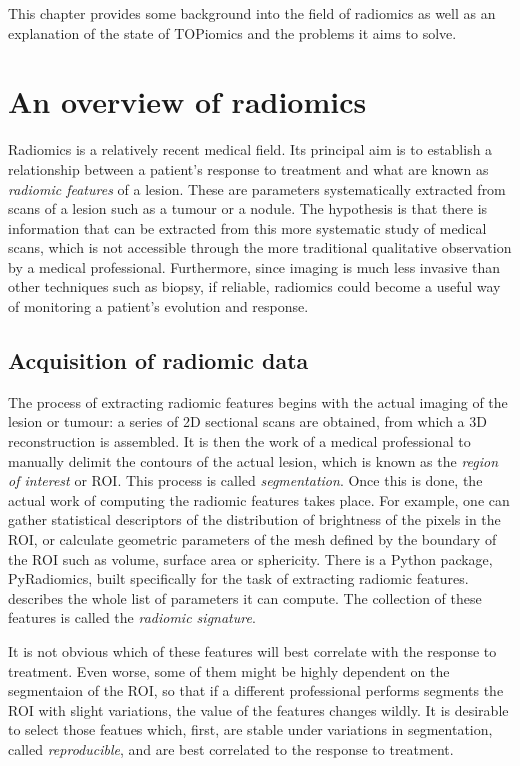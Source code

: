 \documentclass[../main.tex]{subfiles}
\begin{document}
This chapter provides some background into the field of radiomics as well as an
explanation of the state of TOPiomics and the problems it aims to solve. 

\section{An overview of radiomics}
Radiomics is a relatively recent medical field. Its principal aim is to establish a
relationship between a patient's response to treatment and what are known as
\emph{radiomic features} of a lesion. These are parameters systematically extracted from
scans of a lesion such as a tumour or a nodule. The hypothesis is that there is information
that can be extracted from this more systematic study of medical scans, which is not
accessible through the more traditional qualitative observation by a medical professional.
Furthermore, since imaging is much less invasive than other techniques such as biopsy, if
reliable, radiomics could become a useful way of monitoring a patient's evolution and
response. 

\subsection{Acquisition of radiomic data}
The process of extracting radiomic features begins with the actual imaging of the lesion
or tumour: a series of 2D sectional scans are obtained, from which a 3D reconstruction is
assembled. It is then the work of a medical professional to manually delimit the contours
of the actual lesion, which is known as the \emph{region of interest} or ROI. This process is
called \emph{segmentation}. Once this is done, the actual work of computing the radiomic
features takes place. For example, one can gather statistical descriptors of the
distribution of brightness of the pixels in the ROI, or calculate geometric parameters of
the mesh defined by the boundary of the ROI such as volume, surface area or sphericity.
There is a Python package, \textsf{PyRadiomics}, built specifically for the task of
extracting radiomic features. \cite{pyradiomics} describes the whole list of parameters it
can compute. The collection of these features is called the \emph{radiomic signature}. 

It is not obvious which of these features will best correlate with the response to
treatment. Even worse, some of them might be highly dependent on the segmentaion of the
ROI, so that if a different professional performs segments the ROI with slight variations,
the value of the features changes wildly. It is desirable to select those featues which,
first, are stable under variations in segmentation, called \emph{reproducible}, and are
best correlated to the response to treatment. 
\end{document}
